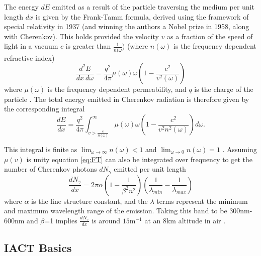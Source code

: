 The energy $dE$ emitted as a result of the particle traversing the medium per unit length $dx$ is given by the Frank-Tamm formula, derived using the framework of special relativity in 1937 (and winning the authors a Nobel prize in 1958, along with Cherenkov). This holds provided the velocity $v$ as a fraction of the speed of light in a vacuum $c$ is greater than $\frac{1}{n(\omega})$ (where $n(\omega)$ is the frequency dependent refractive index)
\begin{equation}
    \frac{d^2E}{dx\ d\omega}=\frac{q^2}{4\pi}\mu(\omega)\omega\left(1- \frac{c^2}{v^2(\omega)} \right)
    \label{eq:FT}
\end{equation}
where $\mu(\omega)$ is the frequency dependent permeability, and $q$ is the charge of the particle \cite{franktamm}. The total energy emitted in Cherenkov radiation is therefore given by the corresponding integral
\begin{equation}
    \frac{dE}{dx}=\frac{q^2}{4\pi}\int_{v>\frac{c}{n(\omega)}}^{\infty}\mu(\omega)\omega \left(1- \frac{c^2}{v^2n^2(\omega)} \right) d \omega .
    \label{eq:FT2}
\end{equation}

This integral is finite as $\lim_{\omega \to \infty} n(\omega)<1$ and $\lim_{\omega \to 0} n(\omega)=1$ . Assuming $\mu(v)$ is unity equation \ref{eq:FT} can also be integrated over frequency \cite{katz} to get the number of Cherenkov photons $dN_{\gamma}$ emitted per unit length
\begin{equation}
    \frac{dN_{\gamma}}{dx}=2\pi\alpha \left( 1- \frac{1}{\beta^2n^2} \right) \left(\frac{1}{\lambda_{min}}-\frac{1}{\lambda_{max}} \right)
\end{equation}
where $\alpha$ is the fine structure constant, and the $\lambda$ terms represent the minimum and maximum wavelength range of the emission. Taking this band to be 300nm-600nm and $\beta$=1 implies $\frac{dN_{\gamma}}{dx}$ is around $\mathrm{15 m^{-1}}$ at an 8km altitude in air \cite{katz}. 
\subsection{IACT Basics}

